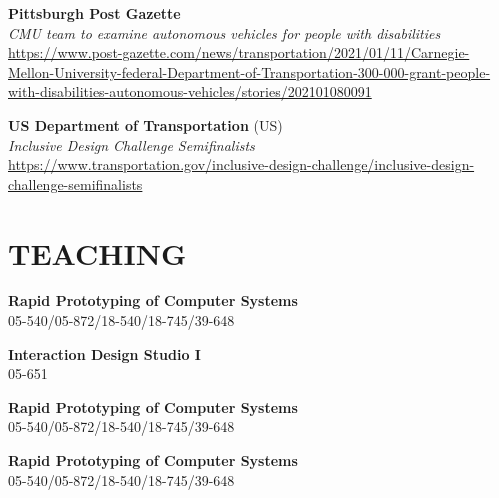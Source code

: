 \documentclass[11pt]{article} %
\begin{document}
 \textbf{Pittsburgh Post Gazette}\\
\textit{CMU team to examine autonomous vehicles for people with disabilities}\\
\sloppy
\href{https://www.post-gazette.com/news/transportation/2021/01/11/Carnegie-Mellon-University-federal-Department-of-Transportation-300-000-grant-people-with-disabilities-autonomous-vehicles/stories/202101080091}{https://www.post-gazette.com/news/transportation/2021/01/11/Carnegie-Mellon-University-federal-Department-of-Transportation-300-000-grant-people-with-disabilities-autonomous-vehicles/stories/202101080091}
\medskip

 \textbf{US Department of Transportation} (US)\\
\textit{Inclusive Design Challenge Semifinalists}\\
\href{https://www.transportation.gov/inclusive-design-challenge/inclusive-design-challenge-semifinalists}{https://www.transportation.gov/inclusive-design-challenge/inclusive-design-challenge-semifinalists}


\section*{\uppercase{Teaching}}
 \textbf{Rapid Prototyping of Computer Systems}\\
05-540/05-872/18-540/18-745/39-648\\
\medskip


 \textbf{Interaction Design Studio I}\\
05-651
\medskip

 \textbf{Rapid Prototyping of Computer Systems}\\
05-540/05-872/18-540/18-745/39-648\\
\medskip

 \textbf{Rapid Prototyping of Computer Systems}\\
05-540/05-872/18-540/18-745/39-648\\

\end{document}
